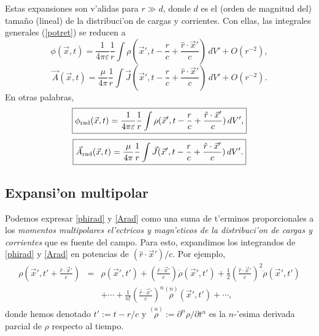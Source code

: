 Estas expansiones son v'alidas para $r\gg d$, donde $d$ es el (orden de magnitud del) tama\~no (lineal) de la distribuci'on de cargas y corrientes. Con ellas, las integrales generales (\ref{potret}) se reducen a
\begin{equation}
 \phi(\vec{x},t)=\frac{1}{4\pi\varepsilon}\frac{1}{r}\int\rho(\vec{x}',t-\frac{r}{c}+\frac{\hat{r}\cdot\vec{x}'}{c})\,dV'+O(r^{-2}),
\end{equation}
\begin{equation}
 \vec{A}(\vec{x},t)=\frac{\mu}{4\pi}\frac{1}{r}\int\vec{J}(\vec{x}',t-\frac{r}{c}+\frac{\hat{r}\cdot\vec{x}'}{c})\,dV'+O(r^{-2}).
\end{equation}
En otras palabras,
\begin{equation}
 \boxed{\phi_{\rm rad}(\vec{x},t)
=\frac{1}{4\pi\varepsilon}\frac{1}{r}\int\rho(\vec{x}',t-\frac{r}{c}+\frac{\hat{r}\cdot\vec{x}'}{c})\,dV',} \label{phirad}
\end{equation}
\begin{equation}
 \boxed{\vec{A}_{\rm rad}(\vec{x},t)
=\frac{\mu}{4\pi}\frac{1}{r}\int\vec{J}(\vec{x}',t-\frac{r}{c}+\frac{\hat{r}\cdot\vec{x}'}{c})\,dV'.} \label{Arad}
\end{equation}

\subsection{Expansi'on multipolar}\label{sec:emr}

Podemos expresar \eqref{phirad} y \eqref{Arad} como una suma de t'erminos proporcionales a los \textit{momentos multipolares el'ectricos y magn'eticos de la distribuci'on de cargas y corrientes} que es fuente del campo. Para esto, expandimos los integrandos de \eqref{phirad} y \eqref{Arad} en potencias de $(\hat{r}\cdot\vec{x}')/c$. Por ejemplo,
\begin{eqnarray}
 \rho(\vec{x}',t'+\frac{\hat{r}\cdot\vec{x}'}{c})&=&\rho(\vec{x}',t')+\left(\frac{\hat{r}\cdot\vec{x}'}{c}\right)\dot\rho(\vec{x}',t')+\frac{1}{2}\left(\frac{\hat{r}\cdot\vec{x}'}{c}\right)^2\ddot\rho(\vec{x}',t') \nonumber\\
 &&+\cdots+\frac{1}{n!}\left(\frac{\hat{r}\cdot\vec{x}'}{c}\right)^n\stackrel{(n)}{\rho}\!\!\!(\vec{x}',t')+\cdots ,
\end{eqnarray}
donde hemos denotado $t':=t-r/c$ y $\stackrel{(n)}{\rho}:=\partial^n\rho/\partial t^n$ es la $n$-'esima derivada parcial de $\rho$ respecto al tiempo.

